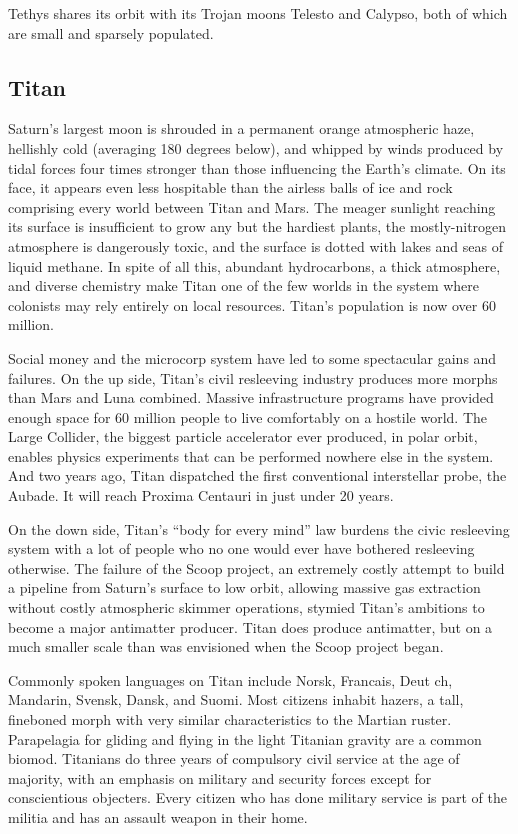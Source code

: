 Tethys shares its orbit with its Trojan moons Telesto and Calypso,
both of which are small and sparsely populated.

\subsection{Titan}
\label{sec:titan}

Saturn's largest moon is shrouded in a permanent orange atmospheric
haze, hellishly cold (averaging 180 degrees below), and whipped by
winds produced by tidal forces four times stronger than those
influencing the Earth's climate. On its face, it appears even less
hospitable than the airless balls of ice and rock comprising every
world between Titan and Mars. The meager sunlight reaching its surface
is insufficient to grow any but the hardiest plants, the
mostly-nitrogen atmosphere is dangerously toxic, and the surface is
dotted with lakes and seas of liquid methane. In spite of all this,
abundant hydrocarbons, a thick atmosphere, and diverse chemistry make
Titan one of the few worlds in the system where colonists may rely
entirely on local resources. Titan's population is now over 60
million.

Social money and the microcorp system have led to some spectacular
gains and failures. On the up side, Titan's civil resleeving industry
produces more morphs than Mars and Luna combined. Massive
infrastructure programs have provided enough space for 60 million
people to live comfortably on a hostile world. The Large Collider, the
biggest particle accelerator ever produced, in polar orbit, enables
physics experiments that can be performed nowhere else in the
system. And two years ago, Titan dispatched the first conventional
interstellar probe, the Aubade. It will reach Proxima Centauri in just
under 20 years.

On the down side, Titan's “body for every mind” law burdens the civic
resleeving system with a lot of people who no one would ever have
bothered resleeving otherwise. The failure of the Scoop project, an
extremely costly attempt to build a pipeline from Saturn's surface to
low orbit, allowing massive gas extraction without costly atmospheric
skimmer operations, stymied Titan's ambitions to become a major
antimatter producer. Titan does produce antimatter, but on a much
smaller scale than was envisioned when the Scoop project began.

Commonly spoken languages on Titan include Norsk, Francais, Deut ch,
Mandarin, Svensk, Dansk, and Suomi. Most citizens inhabit hazers, a
tall, fineboned morph with very similar characteristics to the Martian
ruster. Parapelagia for gliding and flying in the light Titanian
gravity are a common biomod.  Titanians do three years of compulsory
civil service at the age of majority, with an emphasis on military and
security forces except for conscientious objecters.  Every citizen who
has done military service is part of the militia and has an assault
weapon in their home.

